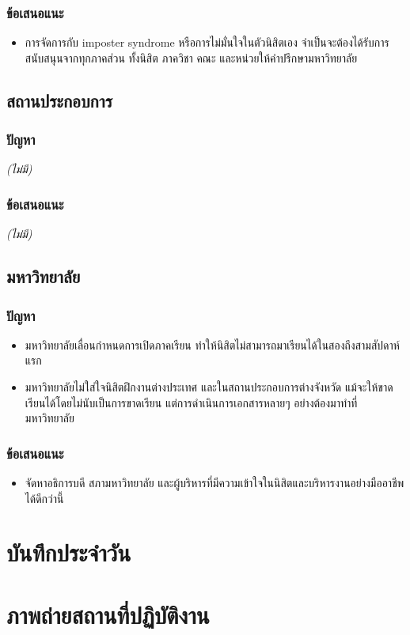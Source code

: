 \documentclass[16pt,a4]{internshipreport}
\begin{document}
\subsection{ข้อเสนอแนะ}

\begin{itemize}
    \item การจัดการกับ imposter syndrome หรือการไม่มั่นใจในตัวนิสิตเอง จำเป็นจะต้องได้รับการสนับสนุนจากทุกภาคส่วน ทั้งนิสิต ภาควิชา คณะ และหน่วยให้คำปรึกษามหาวิทยาลัย
\end{itemize}

\section{สถานประกอบการ}
\subsection{ปัญหา}

\textit{(ไม่มี)}

\subsection{ข้อเสนอแนะ}

\textit{(ไม่มี)}

\section{มหาวิทยาลัย}

\subsection{ปัญหา}

\begin{itemize}
    \item มหาวิทยาลัยเลื่อนกำหนดการเปิดภาคเรียน ทำให้นิสิตไม่สามารถมาเรียนได้ในสองถึงสามสัปดาห์แรก
    \item มหาวิทยาลัยไม่ใส่ใจนิสิตฝึกงานต่างประเทศ และในสถานประกอบการต่างจังหวัด แม้จะให้ขาดเรียนได้โดยไม่นับเป็นการขาดเรียน แต่การดำเนินการเอกสารหลายๆ อย่างต้องมาทำที่มหาวิทยาลัย
\end{itemize}

\subsection{ข้อเสนอแนะ}

\begin{itemize}
    \item จัดหาอธิการบดี สภามหาวิทยาลัย และผู้บริหารที่มีความเข้าใจในนิสิตและบริหารงานอย่างมืออาชีพได้ดีกว่านี้
\end{itemize}





\begin{appendices}
\renewcommand{\thechapter}{\thaiAlph{chapter}}
    
\chapter{บันทึกประจำวัน}


\chapter{ภาพถ่ายสถานที่ปฏิบัติงาน}

\end{appendices}
\end{document}
